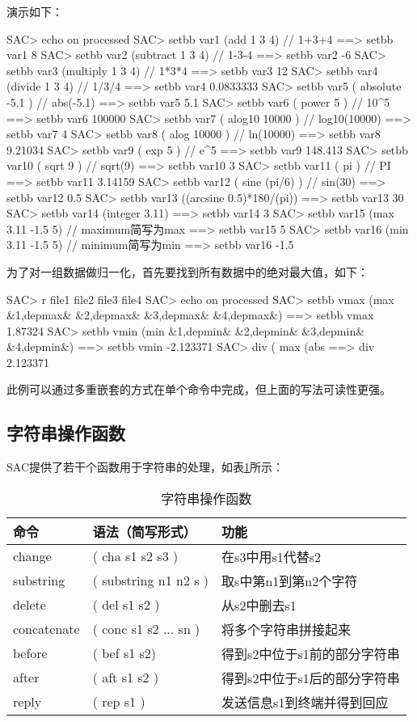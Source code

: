 演示如下：
\begin{SACCode}
SAC> echo on processed
SAC> setbb var1 (add 1 3 4)         // 1+3+4
 ==>  setbb var1 8
SAC> setbb var2 (subtract 1 3 4)    // 1-3-4
 ==>  setbb var2 -6
SAC> setbb var3 (multiply 1 3 4)    // 1*3*4
 ==>  setbb var3 12
SAC> setbb var4 (divide 1 3 4)      // 1/3/4
 ==>  setbb var4 0.0833333
SAC> setbb var5 ( absolute -5.1 )   // abs(-5.1)
 ==>  setbb var5 5.1
SAC> setbb var6 ( power 5 )         // 10^5
 ==>  setbb var6 100000
SAC> setbb var7 ( alog10 10000 )    // log10(10000)
 ==>  setbb var7 4
SAC> setbb var8 ( alog 10000 )      // ln(10000)
 ==>  setbb var8 9.21034
SAC> setbb var9 ( exp 5 )           // e^5
 ==>  setbb var9 148.413
SAC> setbb var10 ( sqrt 9 )         // sqrt(9)
 ==>  setbb var10 3
SAC> setbb var11 ( pi )             // PI
 ==>  setbb var11 3.14159
 SAC> setbb var12 ( sine (pi/6) )   // sin(30)
 ==>  setbb var12 0.5
SAC> setbb var13 ((arcsine 0.5)*180/(pi))
 ==>  setbb var13 30
SAC> setbb var14 (integer 3.11)
 ==>  setbb var14 3
SAC> setbb var15 (max 3.11 -1.5 5)  // maximum简写为max
 ==>  setbb var15 5
SAC> setbb var16 (min 3.11 -1.5 5)  // minimum简写为min
 ==>  setbb var16 -1.5
\end{SACCode}

为了对一组数据做归一化，首先要找到所有数据中的绝对最大值，如下：
\begin{SACCode}
SAC> r file1 file2 file3 file4
SAC> echo on processed
SAC> setbb vmax (max &1,depmax& &2,depmax& &3,depmax& &4,depmax&)
 ==> setbb vmax 1.87324
SAC> setbb vmin (min &1,depmin& &2,depmin& &3,depmin& &4,depmin&)
 ==> setbb vmin -2.123371
SAC> div ( max (abs %
 ==>  div 2.123371 
\end{SACCode}
此例可以通过多重嵌套的方式在单个命令中完成，但上面的写法可读性更强。

\subsection{字符串操作函数}
SAC提供了若干个函数用于字符串的处理，如表\ref{table:string-operation-functions}所示：

\begin{table}[h]
\centering
\ttfamily
\scriptsize
\caption{字符串操作函数}
\label{table:string-operation-functions}
\begin{tabular}{lll}
	\toprule
	命令	&	语法（简写形式）	&	功能	\\
	\midrule
	change		&	( cha s1 s2 s3 ) 	&	在s3中用s1代替s2	\\
	substring 	&	( substring n1 n2 s ) 	&	取s中第n1到第n2个字符\\
	delete		&	( del s1 s2 )		&	从s2中删去s1	\\
	concatenate &	( conc s1 s2 ... sn )	&	将多个字符串拼接起来 \\
	before		&	( bef s1 s2)			&	得到s2中位于s1前的部分字符串\\
	after		&	( aft s1 s2 )			&	得到s2中位于s1后的部分字符串\\
	reply		&	( rep s1 )			&	发送信息s1到终端并得到回应	\\
	\bottomrule
\end{tabular}
\end{table}

